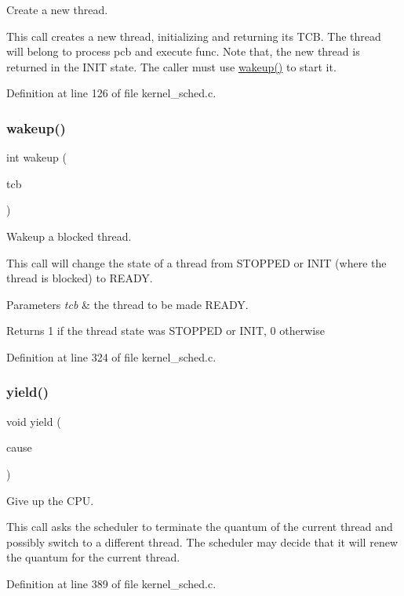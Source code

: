 Create a new thread. 

This call creates a new thread, initializing and returning its T\+CB. The thread will belong to process {\ttfamily pcb} and execute {\ttfamily func}. Note that, the new thread is returned in the {\ttfamily I\+N\+IT} state. The caller must use {\ttfamily \hyperlink{group__scheduler_gae8301452fd9ae5bf7cd7f2676650ff06}{wakeup()}} to start it. 

Definition at line 126 of file kernel\+\_\+sched.\+c.

\mbox{\label{group__scheduler_gae8301452fd9ae5bf7cd7f2676650ff06}} 
\subsubsection{\texorpdfstring{wakeup()}{wakeup()}}
{\footnotesize\ttfamily int wakeup (\begin{DoxyParamCaption}\item[{\hyperlink{structthread__control__block}{T\+CB} $\ast$}]{tcb }\end{DoxyParamCaption})}



Wakeup a blocked thread. 

This call will change the state of a thread from {\ttfamily S\+T\+O\+P\+P\+ED} or {\ttfamily I\+N\+IT} (where the thread is blocked) to {\ttfamily R\+E\+A\+DY}.


\begin{DoxyParams}{Parameters}
{\em tcb} & the thread to be made {\ttfamily R\+E\+A\+DY}. \\
\hline
\end{DoxyParams}
\begin{DoxyReturn}{Returns}
1 if the thread state was {\ttfamily S\+T\+O\+P\+P\+ED} or {\ttfamily I\+N\+IT}, 0 otherwise 
\end{DoxyReturn}


Definition at line 324 of file kernel\+\_\+sched.\+c.

\mbox{\label{group__scheduler_ga1db327892199949812ae5a52119f2e97}} 
\subsubsection{\texorpdfstring{yield()}{yield()}}
{\footnotesize\ttfamily void yield (\begin{DoxyParamCaption}\item[{enum \hyperlink{group__scheduler_gaad787d8d80312ffca3c0f197b3a25fbe}{S\+C\+H\+E\+D\+\_\+\+C\+A\+U\+SE}}]{cause }\end{DoxyParamCaption})}



Give up the C\+PU. 

This call asks the scheduler to terminate the quantum of the current thread and possibly switch to a different thread. The scheduler may decide that it will renew the quantum for the current thread. 

Definition at line 389 of file kernel\+\_\+sched.\+c.

